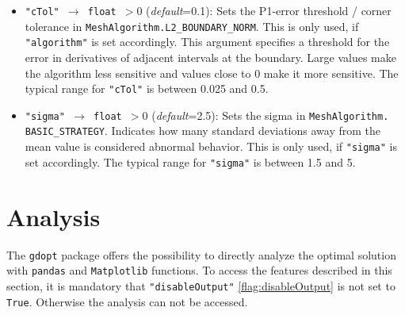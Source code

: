 \documentclass[12pt]{article}
\begin{document}
\begin{mdframed}[backgroundcolor=gray!10, roundcorner=10pt,
		linewidth=1pt]
\begin{itemize}
		      \label{flag:meshCTol}
		\item \texttt{"cTol" $\rightarrow$ float $> 0$}
		      (\emph{default}=0.1): Sets the P1-error threshold /
		      corner tolerance in
		      \texttt{MeshAlgorithm.L2\_BOUNDARY\_NORM}. This is only
		      used, if
		      \texttt{"algorithm"} is set accordingly. This
		      argument specifies a
		      threshold for the error in derivatives of adjacent
		      intervals at the boundary.
		      Large values make the algorithm less sensitive and values
		      close to 0 make it
		      more sensitive.
		      The typical range for \texttt{"cTol"} is between 0.025
		      and 0.5.

		      \label{flag:meshSigma}
		\item \texttt{"sigma" $\rightarrow$ float $> 0$}
		      (\emph{default}=2.5): Sets the sigma in
		      \texttt{MeshAlgorithm.\\BASIC\_STRATEGY}. Indicates how
		      many standard
		      deviations away from the mean value is considered
		      abnormal behavior. This is
		      only used, if \texttt{"sigma"} is set accordingly.
		      The typical range for \texttt{"sigma"} is between 1.5
		      and 5.

	\end{itemize}

\end{mdframed}

\section{Analysis}
\label{c:Analysis}
The \texttt{gdopt} package offers the possibility to directly analyze the
optimal solution with  \texttt{pandas} and \texttt{Matplotlib} functions. To
access the features described in this section, it is mandatory that \texttt{"disableOutput"} \eqref{flag:disableOutput} is not set to \texttt{True}. Otherwise the analysis can not be accessed.
\end{document}
